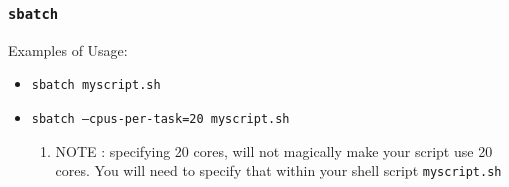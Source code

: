 \documentclass{beamer}
\newcommand{\code}[1]{\colorbox{codegray}{\texttt{#1}}}
\begin{document}
\begin{frame}
\frametitle{\code{sbatch}}
Examples of Usage:
\begin{itemize}
    \item \code{sbatch myscript.sh}
    \bigskip
    \pause
    \item \code{sbatch --cpus-per-task=20 myscript.sh}
    \bigskip
    \pause
    \begin{enumerate}
        \item NOTE : specifying 20 cores, will not magically make your script use 20 cores.
                     You will need to specify that within your shell script \code{myscript.sh}
    \end{enumerate}
\end{itemize}


\end{frame}
\end{document}
